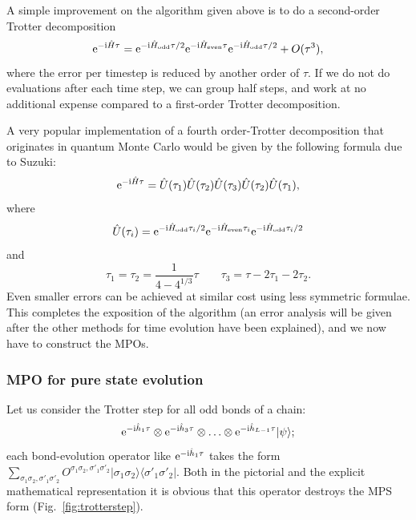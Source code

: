 \documentclass[a4paper,10pt,oneside,onecolumn,1p,times]{elsarticle}
\newcommand{\eul}{{\rm e }}
\newcommand{\imag}{{\rm i }}
\newcommand{\bra}[1]{\mbox{$\langle #1  |$}}
\newcommand{\ket}[1]{\mbox{$| #1  \rangle$}}
\begin{document}
A simple improvement on the algorithm given above is to do a second-order Trotter decomposition 
\begin{equation}
\eul^{-\imag  \hat{H}\tau} = \eul^{-\imag  \hat{H}_{{\rm odd}} \tau/2}\eul^{-\imag  \hat{H}_{{\rm even}} \tau}\eul^{-\imag  \hat{H}_{{\rm odd}} \tau/2} + O(\tau^3),
\end{equation}
where the error per timestep is reduced by another order of  $\tau$. If we do not do evaluations after each time step, we can group half steps, and work at no additional expense compared to a first-order Trotter decomposition.

A very popular implementation of a fourth order-Trotter decomposition that originates in quantum Monte Carlo would be given by the following formula due to Suzuki\cite{Suzuki76,Suzuki91}:
\begin{equation}
\eul^{-\imag  \hat{H}\tau} = \hat{U}(\tau_1) \hat{U}(\tau_2) \hat{U}(\tau_3) \hat{U}(\tau_2) \hat{U}(\tau_1),  
\end{equation}
where 
\begin{equation}
\hat{U} (\tau_i) = \eul^{-\imag  \hat{H}_{{\rm odd}} \tau_i/2}\eul^{-\imag  \hat{H}_{{\rm even}} \tau_i}\eul^{-\imag  \hat{H}_{{\rm odd}}
\tau_i/2}
\end{equation}
and
\begin{equation}
\tau_1 = \tau_2 = \frac{1}{4-4^{1/3}} \tau  \quad\quad \tau_3 = \tau -2 \tau_1 - 2\tau_2 .
\end{equation}
Even smaller errors can be achieved at similar cost using less symmetric formulae\cite{McLachlan95}. This completes the exposition of the algorithm (an error analysis will be given after the other methods for time evolution have been explained), and we now have to construct the MPOs.

\subsubsection{MPO for pure state evolution}
Let us consider the Trotter step for all odd bonds of a chain:
\begin{equation}
\eul^{-\imag  \hat{h}_1 \tau} \otimes \eul^{-\imag  \hat{h}_3 \tau} \otimes \ldots \otimes \eul^{-\imag  \hat{h}_{L-1} \tau} \ket{\psi} ;
\label{eq:oddevolution}
\end{equation}
each bond-evolution operator like $\eul^{-\imag  \hat{h}_1 \tau}$ takes the form $\sum_{\sigma_1 \sigma_2, \sigma'_1 \sigma'_2} O^{\sigma_1\sigma_2,\sigma'_1\sigma'_2} \ket{\sigma_1\sigma_2}\bra{\sigma'_1\sigma'_2}$. Both in the pictorial and the explicit mathematical representation it is obvious that this operator destroys the MPS form (Fig.~\ref{fig:trotterstep}).
\end{document}
